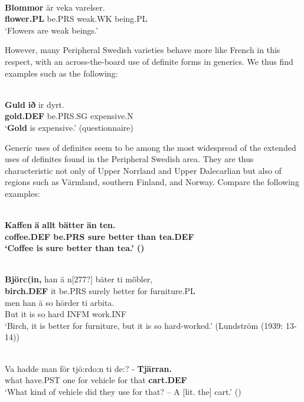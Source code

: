 \ea\label{}
\\
\gll	\textbf{Blommor} är  veka  varelser.\\
		\textbf{flower.PL} be.PRS  weak.WK  being.PL\\
\glt	‘Flowers are weak beings.’

\z

However, many Peripheral Swedish varieties behave more like French in this respect, with an across-the-board use of definite forms in generics. We thus find examples such as the following:

\ea\label{}
\\
\gll	\textbf{Guld} \textbf{ið} ir  dyrt.  \\
		\textbf{gold.DEF} be.PRS.SG  expensive.N  \\
\glt	‘\textbf{Gold} is expensive.’ (questionnaire)

\z

Generic uses of definites seem to be among the most widespread of the extended uses of definites found in the Peripheral Swedish area. They are thus characteristic not only of Upper Norrland and Upper Dalecarlian but also of regions such as Värmland, southern Finland, and Norway. Compare the following examples:

\ea\label{}
\\
\gll	\textbf{Kaffen} \textbf{ä} \textbf{  allt} \textbf{  bätter} \textbf{  än} \textbf{ten.}\\
		\bfseries coffee.DEF  be.PRS  sure  better   than  tea.DEF\\
\glt	‘Coffee is sure better than tea.’ (\citet{Broberg1936})

\z

\ea\label{}
\\
\gll	\textbf{Björc(in,} han  ä  n[277?]  bäter  ti  m\={ö}bler,\\
		\textbf{birch.DEF} it  be.PRS  surely  better  for  furniture.PL\\
\gll 	men  han  ä  so  h\=order  ti  arbita.\\
		But  it  is  so  hard  INFM   work.INF\\
\glt	‘Birch, it is better for furniture, but it is so hard-worked.’ (Lundström (1939: 13-14))

\z

\ea\label{}
\\
\gll	Va  hadde  man  för  tjö:rdo:n  ti  de:?  {}-  \textbf{Tjärran.}\\
		what  have.PST  one  for  vehicle  for  that    \textbf{cart.DEF}\\
\glt	‘What kind of vehicle did they use for that? – A [lit. the] cart.’ (\citet[42]{Harling-KranckEtAL1998})

